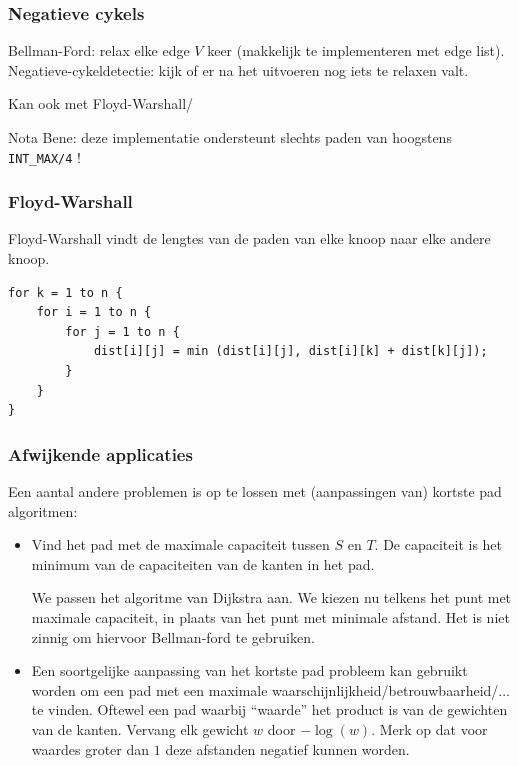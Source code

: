 \documentclass[10pt,a4paper,titlepage]{article}
\begin{document}
\subsubsection{Negatieve cykels}
Bellman-Ford: relax elke edge $V$ keer (makkelijk te implementeren met edge list). Negatieve-cykeldetectie: kijk of er na het uitvoeren nog iets te relaxen valt.

Kan ook met Floyd-Warshall/

Nota Bene: deze implementatie ondersteunt slechts paden van hoogstens \lstinline{INT_MAX/4} !



\iftrue
\subsubsection{Floyd-Warshall}
Floyd-Warshall vindt de lengtes van de paden van elke knoop naar elke andere knoop.

\begin{lstlisting}
for k = 1 to n {
	for i = 1 to n {
		for j = 1 to n {
			dist[i][j] = min (dist[i][j], dist[i][k] + dist[k][j]);
		}
	}
}
\end{lstlisting}


\fi


\subsubsection{Afwijkende applicaties}
Een aantal andere problemen is op te lossen met (aanpassingen van) kortste pad algoritmen:

\begin{itemize}[noitemsep,nolistsep]
\item Vind het pad met de maximale capaciteit tussen $S$ en $T$. De capaciteit is het minimum van de capaciteiten van de kanten in het pad.

We passen het algoritme van Dijkstra aan. We kiezen nu telkens het punt met maximale capaciteit, in plaats van het punt met minimale afstand. Het is niet zinnig om hiervoor Bellman-ford te gebruiken.

\item Een soortgelijke aanpassing van het kortste pad probleem kan gebruikt worden om een pad met een maximale waarschijnlijkheid/betrouwbaarheid/... te vinden. Oftewel een pad waarbij ``waarde'' het product is van de gewichten van de kanten. Vervang elk gewicht $w$ door $-\log(w)$. Merk op dat voor waardes groter dan $1$ deze afstanden negatief kunnen worden.

\end{itemize}
\end{document}
